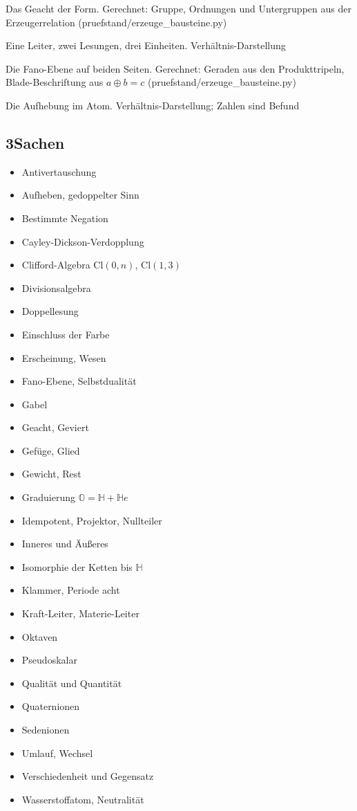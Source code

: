 \documentclass[11pt,a4paper]{article}
\newcommand{\HH}{\mathbb H}
\newcommand{\Oc}{\mathbb O}
\newcommand{\Cl}{\mathrm{Cl}}
\begin{document}
\begin{description}[itemsep=1pt,font=\normalfont\bfseries]
\item[Abb.~\ref{fig:geacht}] Das Geacht der Form. Gerechnet: Gruppe, Ordnungen und Untergruppen aus der Erzeugerrelation (pruefstand/erzeuge\_bausteine.py)
\item[Abb.~\ref{fig:leitern}] Eine Leiter, zwei Lesungen, drei Einheiten. Verhältnis-Darstellung
\item[Abb.~\ref{fig:fano}] Die Fano-Ebene auf beiden Seiten. Gerechnet: Geraden aus den Produkttripeln, Blade-Beschriftung aus $a\oplus b=c$ (pruefstand/erzeuge\_bausteine.py)
\item[Abb.~\ref{fig:atom}] Die Aufhebung im Atom. Verhältnis-Darstellung; Zahlen sind Befund
\end{description}

\subsection*{3\quad Sachen}

\begin{itemize}[leftmargin=1.2em,itemsep=0pt]
\item Antivertauschung
\item Aufheben, gedoppelter Sinn
\item Bestimmte Negation
\item Cayley-Dickson-Verdopplung
\item Clifford-Algebra $\Cl(0,n)$, $\Cl(1,3)$
\item Divisionsalgebra
\item Doppellesung
\item Einschluss der Farbe
\item Erscheinung, Wesen
\item Fano-Ebene, Selbstdualität
\item Gabel
\item Geacht, Geviert
\item Gefüge, Glied
\item Gewicht, Rest
\item Graduierung $\Oc=\HH+\HH e$
\item Idempotent, Projektor, Nullteiler
\item Inneres und Äußeres
\item Isomorphie der Ketten bis $\HH$
\item Klammer, Periode acht
\item Kraft-Leiter, Materie-Leiter
\item Oktaven
\item Pseudoskalar
\item Qualität und Quantität
\item Quaternionen
\item Sedenionen
\item Umlauf, Wechsel
\item Verschiedenheit und Gegensatz
\item Wasserstoffatom, Neutralität
\end{itemize}
\end{document}
